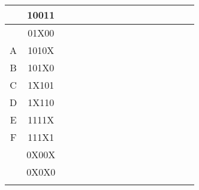 \documentclass{article}
\begin{document}
\begin{flushleft}
\begin{tabular}{|c|c|r*{13}{|c}|}
    & 10011&\makecell{ }&\makecell{ }&\makecell{ }&\makecell{ }&\makecell{ }&\makecell{ }&&\makecell{ }&\makecell{ }&\makecell{ }&\makecell{ }&\makecell{ }&\makecell{ }\\ [-1.6ex] \hline\noalign{\vspace{\dimexpr 1.6ex-\doublerulesep}} \hline
    & 01X00&\makecell{ }&\makecell{ }&\makecell{ }&\makecell{ }&\makecell{ }&&\makecell{ }&\makecell{ }&\makecell{ }&\makecell{ }&\makecell{ }&\makecell{ }&\makecell{ }\\ [-1.6ex] \hline\noalign{\vspace{\dimexpr 1.6ex-\doublerulesep}} \hline
    A & 1010X&\makecell{ }&\makecell{ }&\makecell{ }&\makecell{ }&\makecell{ }&\makecell{ }&\makecell{ }&&&\makecell{ }&\makecell{ }&\makecell{ }&\makecell{ }\\ \hline
    B & 101X0&\makecell{ }&\makecell{ }&\makecell{ }&\makecell{ }&\makecell{ }&\makecell{ }&\makecell{ }&&\makecell{ }&&\makecell{ }&\makecell{ }&\makecell{ }\\ \hline
    C & 1X101&\makecell{ }&\makecell{ }&\makecell{ }&\makecell{ }&\makecell{ }&\makecell{ }&\makecell{ }&\makecell{ }&&\makecell{ }&&\makecell{ }&\makecell{ }\\ \hline
    D & 1X110&\makecell{ }&\makecell{ }&\makecell{ }&\makecell{ }&\makecell{ }&\makecell{ }&\makecell{ }&\makecell{ }&\makecell{ }&&\makecell{ }&&\makecell{ }\\ \hline
    E & 1111X&\makecell{ }&\makecell{ }&\makecell{ }&\makecell{ }&\makecell{ }&\makecell{ }&\makecell{ }&\makecell{ }&\makecell{ }&\makecell{ }&\makecell{ }&&\\ \hline
    F & 111X1&\makecell{ }&\makecell{ }&\makecell{ }&\makecell{ }&\makecell{ }&\makecell{ }&\makecell{ }&\makecell{ }&\makecell{ }&\makecell{ }&&\makecell{ }&\\ \hline
    & 0X00X&&&&\makecell{ }&\makecell{ }&\makecell{ }&\makecell{ }&\makecell{ }&\makecell{ }&\makecell{ }&\makecell{ }&\makecell{ }&\makecell{ }\\ [-1.6ex] \hline\noalign{\vspace{\dimexpr 1.6ex-\doublerulesep}} \hline
    & 0X0X0&&\makecell{ }&\makecell{ }&&\makecell{ }&\makecell{ }&\makecell{ }&\makecell{ }&\makecell{ }&\makecell{ }&\makecell{ }&\makecell{ }&\makecell{ }\\ [-1.6ex] \hline\noalign{\vspace{\dimexpr 1.6ex-\doublerulesep}} \hline

\end{tabular}
\end{flushleft}
\end{document}
